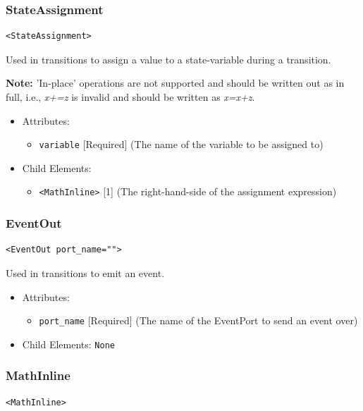 \documentclass{article}
\newcommand{\note}[1]{%
\begin{center}
\colorbox{issuecolor}{\parbox{0.8\linewidth}{\textbf{Note:} #1}}
\end{center}%
}
\begin{document}
\subsubsection{StateAssignment}
%
\begin{lstlisting}
<StateAssignment>
\end{lstlisting}

Used in transitions to assign a value to a state-variable during a transition.

\note{'In-place' operations are not supported and should be written out as in full,
i.e., \textsl{x+=z} is invalid and should be written as \textsl{x=x+z}.}

\begin{itemize}
\item Attributes:
%
\begin{itemize}
\item \verb|variable| {[}Required{]} (The name of the variable to be assigned to)
\end{itemize}

\item Child Elements:
%
\begin{itemize}
\item \verb|<MathInline>| {[}1{]} (The right-hand-side of the assignment expression)
\end{itemize}
\end{itemize}

\subsubsection{EventOut}
%
\begin{lstlisting}
<EventOut port_name="">
\end{lstlisting}

Used in transitions to emit an event.

\begin{itemize}
\item Attributes:
%
\begin{itemize}
\item \verb|port_name| {[}Required{]} (The name of the EventPort to send an event over)
\end{itemize}

\item Child Elements: \texttt{None}
\end{itemize}

\subsubsection{MathInline}
%
\begin{lstlisting}
<MathInline>
\end{lstlisting}
\end{document}
